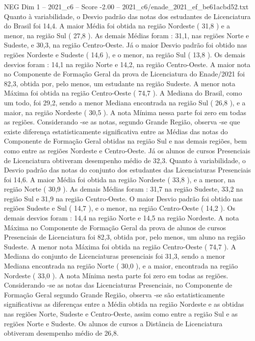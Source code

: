 \begin{textsample}{NEG Dim 1 – 2021\_c6 – Score -2.00 – 2021\_c6/enade\_2021\_ef\_be61acbd52.txt}
Quanto à variabilidade, o Desvio padrão das notas dos estudantes de Licenciatura do Brasil foi 14,4.
A maior Média foi obtida na região Nordeste ( 31,8 ) e a menor, na região Sul ( 27,8 ).
As demais Médias foram : 31,1, nas regiões Norte e Sudeste, e 30,3, na região Centro-Oeste.
Já o maior Desvio padrão foi obtido nas regiões Nordeste e Sudeste ( 14,6 ), e o menor, na região Sul ( 13,8 ).
Os demais desvios foram : 14,1 na região Norte e 14,2, na região Centro-Oeste.
A maior nota no Componente de Formação Geral da prova de Licenciatura do Enade/2021 foi 82,3, obtida por, pelo menos, um estudante na região Sudeste.
A menor nota Máxima foi obtida na região Centro-Oeste ( 74,7 ).
A Mediana do Brasil, como um todo, foi 29,2, sendo a menor Mediana encontrada na região Sul ( 26,8 ), e a maior, na região Nordeste ( 30,5 ).
A nota Mínima nessa parte foi zero em todas as regiões.
Considerando -se as notas, segundo Grande Região, observa -se que existe diferença estatisticamente significativa entre as Médias das notas do Componente de Formação Geral obtidas na região Sul e nas demais regiões, bem como entre as regiões Nordeste e Centro-Oeste.
Já os alunos de cursos Presenciais de Licenciatura obtiveram desempenho médio de 32,3.
Quanto à variabilidade, o Desvio padrão das notas do conjunto dos estudantes das Licenciaturas Presenciais foi 14,6.
A maior Média foi obtida na região Nordeste ( 33,8 ), e a menor, na região Norte ( 30,9 ).
As demais Médias foram : 31,7 na região Sudeste, 33,2 na região Sul e 31,9 na região Centro-Oeste.
O maior Desvio padrão foi obtido nas regiões Sudeste e Sul ( 14,7 ), e o menor, na região Centro-Oeste ( 14,2 ).
Os demais desvios foram : 14,4 na região Norte e 14,5 na região Nordeste.
A nota Máxima no Componente de Formação Geral da prova de alunos de cursos Presenciais de Licenciatura foi 82,3, obtida por, pelo menos, um aluno na região Sudeste.
A menor nota Máxima foi obtida na região Centro-Oeste ( 74,7 ).
A Mediana do conjunto de Licenciaturas presenciais foi 31,3, sendo a menor Mediana encontrada na região Norte ( 30,0 ), e a maior, encontrada na região Nordeste ( 33,0 ).
A nota Mínima nesta parte foi zero em todas as regiões.
Considerando -se as notas das Licenciaturas Presenciais, no Componente de Formação Geral segundo Grande Região, observa -se são estatisticamente significativas as diferenças entre a Média obtida na região Nordeste e as obtidas nas regiões Norte, Sudeste e Centro-Oeste, assim como entre a região Sul e as regiões Norte e Sudeste.
Os alunos de cursos a Distância de Licenciatura obtiveram desempenho médio de 26,8.

\end{textsample}
